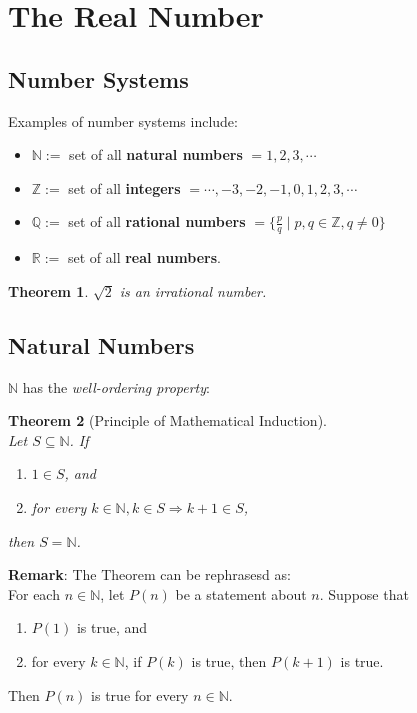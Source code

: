 \documentclass[8pt]{article}
\newtheorem{theorem}{Theorem}[section]
\theoremstyle{definition}
\begin{document}


\section{The Real Number}
\subsection{Number Systems}
Examples of number systems include:
\begin{itemize}
\item $\mathbb{N}:=$ set of all \textbf{natural numbers} $={1,2,3,\cdots}$
\item $\mathbb{Z}:=$ set of all \textbf{integers} $= {\cdots,-3,-2,-1,0,1,2,3,\cdots}$
\item $\mathbb{Q}:=$ set of all \textbf{rational numbers} $= \{\frac{p}{q}\mid p,q\in\mathbb{Z},q\neq 0\}$
\item $\mathbb{R}:=$ set of all \textbf{real numbers}.
\end{itemize}
\begin{theorem}
\normalfont $\sqrt{2}$ is an irrational number.
\end{theorem}
\subsection{Natural Numbers}
$\mathbb{N}$ has the \textit{well-ordering property}:
\begin{center}
\end{center}
\begin{theorem}[Principle of Mathematical Induction]
\hfill\\\normalfont Let $S\subseteq\mathbb{N}$. If
\begin{enumerate}[label=(\roman*)]
\item $1\in S$, and
\item for every $k\in\mathbb{N}, k\in S\Rightarrow k+1\in S$,
\end{enumerate}
then $S=\mathbb{N}$.
\end{theorem}
\textbf{Remark}: The Theorem can be rephrasesd as:\\
For each $n\in\mathbb{N}$, let $P(n)$ be a statement about $n$. Suppose that
\begin{enumerate}[label=(\roman*)]
\item $P(1)$ is true, and 
\item for every $k\in\mathbb{N}$, if $P(k)$ is true, then $P(k+1)$ is true.
\end{enumerate}
Then $P(n)$ is true for every $n\in\mathbb{N}$.
\end{document}

